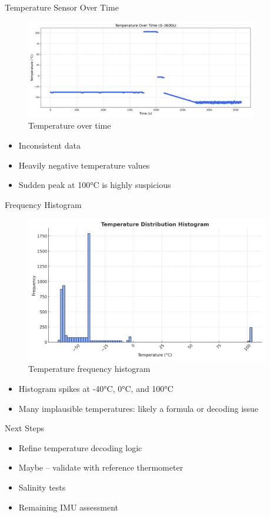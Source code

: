 \begin{frame}{Temperature Sensor Over Time}
    \begin{figure}
        \centering
        \includegraphics[height=0.5\textheight,width=0.9\textwidth,keepaspectratio]{images/temp_over_time.png}
        \caption{Temperature over time}
    \end{figure}
    \vspace{-1em}
    \begin{itemize}
        \item Inconsistent data
        \item Heavily negative temperature values
        \item Sudden peak at 100°C is highly suspicious
    \end{itemize}
\end{frame}

\begin{frame}{Frequency Histogram}
    \begin{figure}
        \centering
        \includegraphics[height=0.6\textheight,width=0.95\textwidth,keepaspectratio]{images/temp_histogram.png}
        \caption{Temperature frequency histogram}
    \end{figure}
    \vspace{-0.5em}
    \begin{itemize}
        \item Histogram spikes at  -40°C, 0°C, and 100°C
        \item Many implausible temperatures: likely a formula or decoding issue
    \end{itemize}
\end{frame}

\begin{frame}{Next Steps}
    \begin{itemize}
        \item Refine temperature decoding logic
        \item Maybe -- validate with reference thermometer
        \item Salinity tests
        \item Remaining IMU assessment
    \end{itemize}
\end{frame}